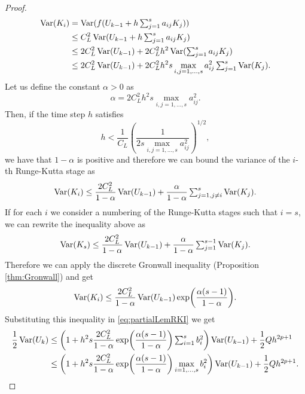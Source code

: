 \begin{proof}
\begin{equation}
\begin{aligned}
\operatorname{Var}(K_i) &= \operatorname{Var}(f(U_{k-1} + h\textstyle\sum_{j=1}^{s}a_{ij}K_j)) \\
&\leq C_L^2 \operatorname{Var}(U_{k-1} + h\textstyle\sum_{j=1}^{s}a_{ij}K_j) \\
&\leq 2C_L^2 \operatorname{Var}(U_{k-1}) + 2C_L^2h^2\operatorname{Var}(\textstyle\sum_{j=1}^{s}a_{ij}K_j)\\
&\leq 2C_L^2 \operatorname{Var}(U_{k-1}) + 2C_L^2h^2s\max_{i,j=1,\ldots,s}a_{ij}^2 \textstyle\sum_{j=1}^{s}\operatorname{Var}(K_j).
\end{aligned}
\end{equation}
Let us define the constant $\alpha > 0$ as
\begin{equation}
\alpha = 2C_L^2h^2s\max_{i,j=1,\ldots,s}a_{ij}^2.
\end{equation}
Then, if the time step $h$ satisfies
\begin{equation}
h < \frac{1}{C_L}\left(\frac{1}{2s\max_{i,j=1,\ldots,s}a_{ij}^2}\right)^{1/2},
\end{equation}
we have that $1 - \alpha$ is positive and therefore we can bound the variance of the $i$-th Runge-Kutta stage as
\begin{equation}
\operatorname{Var}(K_i) \leq \frac{2C_L^2}{1 - \alpha} \operatorname{Var}(U_{k-1}) + \frac{\alpha}{1-\alpha}\textstyle\sum_{j=1, j\neq i}^{s}\operatorname{Var}(K_j). 
\end{equation}
If for each $i$ we consider a numbering of the Runge-Kutta stages such that $i = s$, we can rewrite the inequality above as
\begin{equation}
\operatorname{Var}(K_s) \leq \frac{2C_L^2}{1 - \alpha} \operatorname{Var}(U_{k-1}) + \frac{\alpha}{1-\alpha}\textstyle\sum_{j=1}^{s-1}\operatorname{Var}(K_j).
\end{equation}
Therefore we can apply the discrete Gronwall inequality (Proposition \ref{thm:Gronwall}) and get
\begin{equation}
\operatorname{Var}(K_i) \leq \frac{2C_L^2}{1 - \alpha} \operatorname{Var}(U_{k-1})\exp(\frac{\alpha(s-1)}{1-\alpha}).
\end{equation}
Substituting this inequality in \eqref{eq:partialLemRKI} we get
\begin{equation}
\begin{aligned}
\frac{1}{2}\Var(U_k) &\leq \left(1 + h^2s\frac{2C_L^2}{1 - \alpha}\exp(\frac{\alpha(s-1)}{1-\alpha})\sksum_{i=1}^s b_i^2\right)\Var(U_{k-1}) + \frac{1}{2}Q h^{2p+1} \\
&\leq \left(1 + h^2s\frac{2C_L^2}{1 - \alpha}\exp(\frac{\alpha(s-1)}{1-\alpha})\max_{i=1,\ldots,s} b_i^2\right)\Var(U_{k-1}) + \frac{1}{2}Q h^{2p+1}.
\end{aligned}

\end{equation}
\end{proof}
